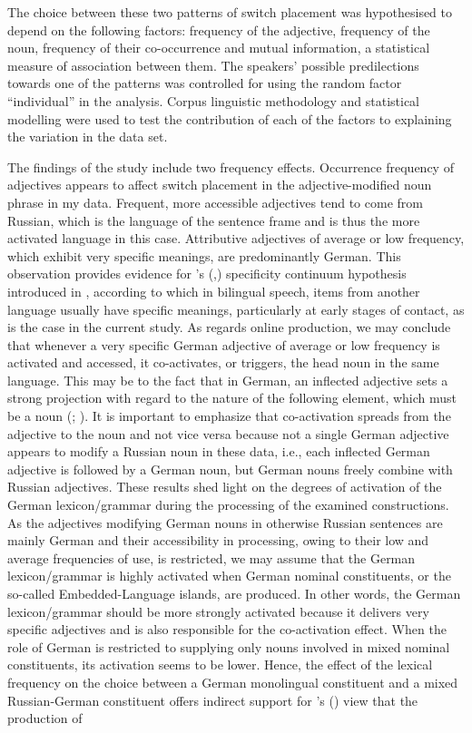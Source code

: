 The choice between these two patterns of switch placement was hypothesised to depend on the following factors: frequency of the adjective, frequency of the noun, frequency of their co-occurrence and mutual information, a statistical measure of association between them. The speakers' possible predilections towards one of the patterns was controlled for using the random factor “individual” in the analysis. Corpus linguistic methodology and statistical modelling were used to test the contribution of each of the factors to explaining the variation in the data set.

The findings of the study include two frequency effects. Occurrence frequency of adjectives appears to affect switch placement in the adjective-modified noun phrase in my data. Frequent, more accessible adjectives tend to come from Russian, which is the language of the sentence frame and is thus the more activated language in this case. Attributive adjectives of average or low frequency, which exhibit very specific meanings, are predominantly German. This observation provides evidence for \citeauthor{backus-evidence-1999}’s (\citeyear{backus-evidence-1999},\citeyear{backus-units-2003}) specificity continuum hypothesis introduced in , according to which in bilingual speech, items from another language usually have specific meanings, particularly at early stages of contact, as is the case in the current study. As regards online production, we may conclude that whenever a very specific German adjective of average or low frequency is activated and accessed, it co-activates, or triggers, the head noun in the same language. This may be to the fact that in German, an inflected adjective sets a strong projection with regard to the nature of the following element, which must be a noun (\citealt[][98]{auer_syntax_2007}; \citealt[cf.][]{auer_projection_2005}). It is important to emphasize that co-activation spreads from the adjective to the noun and not vice versa because not a single German adjective appears to modify a Russian noun in these data, i.e., each inflected German adjective is followed by a German noun, but German nouns freely combine with Russian adjectives. These results shed light on the degrees of activation of the German lexicon/grammar during the processing of the examined constructions. As the adjectives modifying German nouns in otherwise Russian sentences are mainly German and their accessibility in processing, owing to their low and average frequencies of use, is restricted, we may assume that the German lexicon/grammar is highly activated when German nominal constituents, or the so-called Embedded-Language islands, are produced. In other words, the German lexicon/grammar should be more strongly activated because it delivers very specific adjectives and is also responsible for the co-activation effect. When the role of German is restricted to supplying only nouns involved in mixed nominal constituents, its activation seems to be lower. Hence, the effect of the lexical frequency on the choice between a German monolingual constituent and a mixed Russian-German constituent offers indirect support for \citeauthor{myers-scotton-contact-2002}’s (\citeyear[][140]{myers-scotton-contact-2002}) view that the production of 